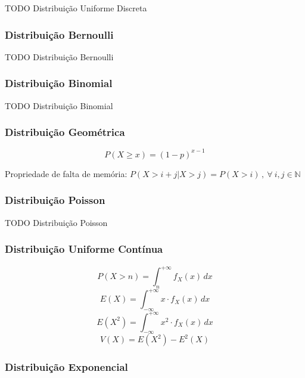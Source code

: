 \documentclass[11pt, a4paper]{article}
\begin{document}
TODO Distribuição Uniforme Discreta

\subsubsection*{Distribuição Bernoulli}

TODO Distribuição Bernoulli

\subsubsection*{Distribuição Binomial}

TODO Distribuição Binomial

\subsubsection*{Distribuição Geométrica}

\begin{equation*}
    P(X \geq x) = (1-p)^{x-1}
\end{equation*}

Propriedade de falta de memória:
$P(X > i + j | X > j) = P(X > i) \, , \ \forall \ i, j \in \mathbb{N}$

\subsubsection*{Distribuição Poisson}

TODO Distribuição Poisson

\subsubsection*{Distribuição Uniforme Contínua}

\begin{equation*}
    P(X > n) = \int_{n}^{+\infty} f_X(x) \, dx
\end{equation*}
\begin{equation*}
    E(X) = \int_{-\infty}^{+\infty} x \cdot f_X(x) \, dx
\end{equation*}
\begin{equation*}
    E(X^2) = \int_{-\infty}^{+\infty} x^2 \cdot f_X(x) \, dx
\end{equation*}
\begin{equation*}
    V(X) = E(X^2) - E^2(X)
\end{equation*}

\subsubsection*{Distribuição Exponencial}
\end{document}
